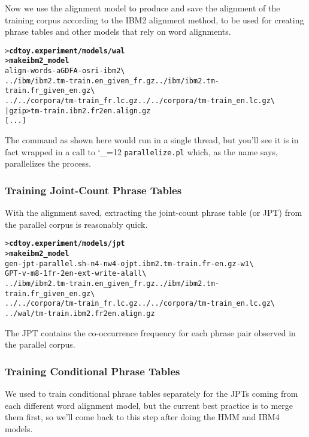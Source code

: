 \documentclass[11pt,letterpaper]{article}
\newcommand{\bs}{\textbackslash{}}
\def\code{\begingroup\catcode`\_=12 \codex}
\newcommand{\codex}[1]{\texttt{#1}\endgroup}
\begin{document}
Now we use the alignment model to produce and save the alignment of the
training corpus according to the IBM2 alignment method, to be used for creating
phrase tables and other models that rely on word alignments.

\begin{small}
\begin{alltt}
   > \textbf{cd toy.experiment/models/wal}
   > \textbf{make ibm2_model}
   align-words -a GDFA -o sri -ibm 2 \bs
      ../ibm/ibm2.tm-train.en_given_fr.gz ../ibm/ibm2.tm-train.fr_given_en.gz \bs
      ../../corpora/tm-train_fr.lc.gz ../../corpora/tm-train_en.lc.gz \bs
      | gzip > tm-train.ibm2.fr2en.align.gz
   [...]
\end{alltt}
\end{small}

The command as shown here would run in a single thread, but you'll see it is in
fact wrapped in a call to \code{parallelize.pl} which, as the name says,
parallelizes the process.

\subsubsection*{Training Joint-Count Phrase Tables}

With the alignment saved, extracting the joint-count phrase table (or JPT) from
the parallel corpus is reasonably quick.
\begin{small}
\begin{alltt}
   > \textbf{cd toy.experiment/models/jpt}
   > \textbf{make ibm2_model}
   gen-jpt-parallel.sh -n 4 -nw 4 -o jpt.ibm2.tm-train.fr-en.gz -w 1 \bs
      GPT -v -m 8 -1 fr -2 en -ext -write-al all \bs
      ../ibm/ibm2.tm-train.en_given_fr.gz ../ibm/ibm2.tm-train.fr_given_en.gz \bs
      ../../corpora/tm-train_fr.lc.gz ../../corpora/tm-train_en.lc.gz \bs
      ../wal/tm-train.ibm2.fr2en.align.gz
\end{alltt}
\end{small}
The JPT contains the co-occurrence frequency for each phrase pair observed in
the parallel corpus.

\subsubsection*{Training Conditional Phrase Tables}

We used to train conditional phrase tables separately for the JPTs coming from
each different word alignment model, but the current best practice is to
merge them first, so we'll come back to this step after doing the HMM and IBM4
models.
\end{document}
